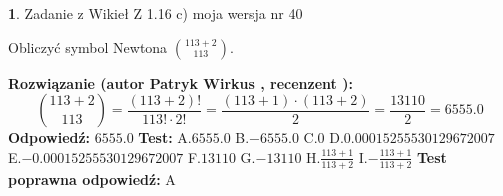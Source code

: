 \documentclass[12pt, a4paper]{article}
\theoremstyle{definition} %
\newtheorem{zad}{}
\newcommand{\zadStart}[1]{\begin{zad}#1\newline}
\newcommand{\zadStop}{\end{zad}}
\newcommand{\rozwStart}[2]{\noindent \textbf{Rozwiązanie (autor #1 , recenzent #2): }\newline}
\newcommand{\rozwStop}{\newline}
\newcommand{\odpStart}{\noindent \textbf{Odpowiedź:}\newline}
\newcommand{\odpStop}{\newline}
\newcommand{\testStart}{\noindent \textbf{Test:}\newline}
\newcommand{\testStop}{\newline}
\newcommand{\kluczStart}{\noindent \textbf{Test poprawna odpowiedź:}\newline}
\newcommand{\kluczStop}{\newline}
\begin{document}
\zadStart{Zadanie z Wikieł Z 1.16 c) moja wersja nr 40}

Obliczyć symbol Newtona ${113+2 \choose 113}$.
\zadStop
\rozwStart{Patryk Wirkus}{}
$${113+2 \choose 113} = \frac{(113+2)!}{113! \cdot 2!} = \frac{(113+1)\cdot(113+2)}{2} = \frac{13110}{2} = 6555.0$$
\rozwStop
\odpStart
$6555.0$
\odpStop
\testStart
A.$6555.0$ B.$-6555.0$ C.$0$ D.$0.00015255530129672007$ E.$-0.00015255530129672007$
F.$13110$ G.$-13110$
H.$\frac{113+1}{113+2}$
I.$-\frac{113+1}{113+2}$
\testStop
\kluczStart
A
\kluczStop
\end{document}
